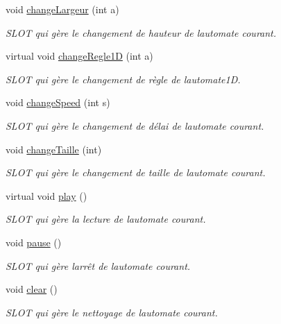 \begin{DoxyCompactItemize}
void \hyperlink{class_main_window_a9f316199d2ac2937364bf417cbd0aa30}{change\+Largeur} (int a)
\begin{DoxyCompactList}\small\item\em S\+L\+OT qui gère le changement de hauteur de l\textquotesingle{}automate courant. \end{DoxyCompactList}\item 
virtual void \hyperlink{class_main_window_abcab912ee0f094d4a6599b9f78f4c182}{change\+Regle1D} (int a)
\begin{DoxyCompactList}\small\item\em S\+L\+OT qui gère le changement de règle de l\textquotesingle{}automate1D. \end{DoxyCompactList}\item 
void \hyperlink{class_main_window_aae185fa2271003f1cce8d7182acae455}{change\+Speed} (int s)
\begin{DoxyCompactList}\small\item\em S\+L\+OT qui gère le changement de délai de l\textquotesingle{}automate courant. \end{DoxyCompactList}\item 
void \hyperlink{class_main_window_ab4b7fc1336fd08e311c9655edc8378c6}{change\+Taille} (int)
\begin{DoxyCompactList}\small\item\em S\+L\+OT qui gère le changement de taille de l\textquotesingle{}automate courant. \end{DoxyCompactList}\item 
virtual void \hyperlink{class_main_window_a4f035b25b6181829a9275155e3ca9bbd}{play} ()
\begin{DoxyCompactList}\small\item\em S\+L\+OT qui gère la lecture de l\textquotesingle{}automate courant. \end{DoxyCompactList}\item 
void \hyperlink{class_main_window_a17cb661f62805c510b99d9162ac8201a}{pause} ()
\begin{DoxyCompactList}\small\item\em S\+L\+OT qui gère l\textquotesingle{}arrêt de l\textquotesingle{}automate courant. \end{DoxyCompactList}\item 
void \hyperlink{class_main_window_a77557e32fb4ed3530daf2f6225c877db}{clear} ()
\begin{DoxyCompactList}\small\item\em S\+L\+OT qui gère le nettoyage de l\textquotesingle{}automate courant. \end{DoxyCompactList}\item 

\end{DoxyCompactItemize}
